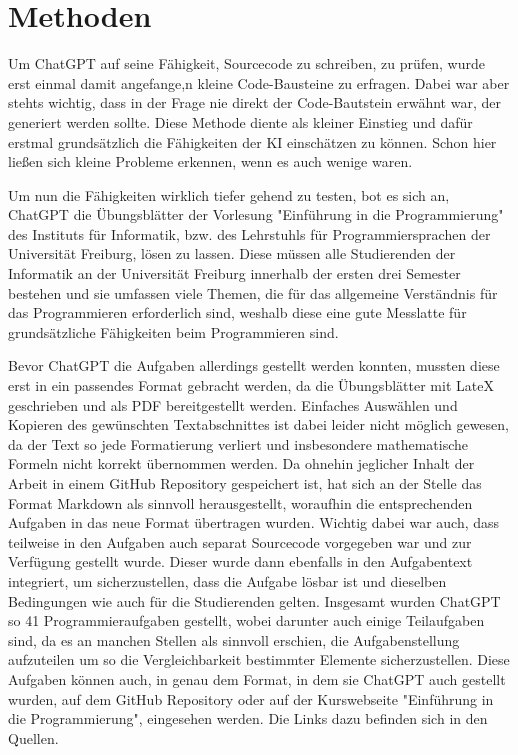 \documentclass[class=scrbook, crop=false]{standalone}
\begin{document}
\chapter{Methoden}
\label{ch:methoden}
    Um ChatGPT auf seine Fähigkeit, Sourcecode zu schreiben, zu prüfen, wurde erst einmal damit angefange,n kleine Code-Bausteine zu erfragen.
    Dabei war aber stehts wichtig, dass in der Frage nie direkt der Code-Bautstein erwähnt war, der generiert werden sollte.
    Diese Methode diente als kleiner Einstieg und dafür erstmal grundsätzlich die Fähigkeiten der KI einschätzen zu können.
    Schon hier ließen sich kleine Probleme erkennen, wenn es auch wenige waren.

    Um nun die Fähigkeiten wirklich tiefer gehend zu testen, bot es sich an, ChatGPT die Übungsblätter der Vorlesung "Einführung in die Programmierung"
    des Instituts für Informatik, bzw. des Lehrstuhls für Programmiersprachen der Universität Freiburg, lösen zu lassen.
    Diese müssen alle Studierenden der Informatik an der Universität Freiburg innerhalb der ersten drei Semester bestehen
    und sie umfassen viele Themen, die für das allgemeine Verständnis für das Programmieren erforderlich sind,
    weshalb diese eine gute Messlatte für grundsätzliche Fähigkeiten beim Programmieren sind.

    Bevor ChatGPT die Aufgaben allerdings gestellt werden konnten, mussten diese erst in ein passendes Format gebracht werden, da
    die Übungsblätter mit LateX geschrieben und als PDF bereitgestellt werden.
    Einfaches Auswählen und Kopieren des gewünschten Textabschnittes ist dabei leider nicht möglich gewesen, da der Text
    so jede Formatierung verliert und insbesondere mathematische Formeln nicht korrekt übernommen werden.
    Da ohnehin jeglicher Inhalt der Arbeit in einem GitHub Repository gespeichert ist,
    hat sich an der Stelle das Format Markdown als sinnvoll herausgestellt, woraufhin die entsprechenden Aufgaben in das neue Format übertragen wurden.
    Wichtig dabei war auch, dass teilweise in den Aufgaben auch separat Sourcecode vorgegeben war und zur Verfügung gestellt wurde.
    Dieser wurde dann ebenfalls in den Aufgabentext integriert, um sicherzustellen, dass die Aufgabe lösbar ist und dieselben Bedingungen wie auch für die Studierenden gelten.
    Insgesamt wurden ChatGPT so 41 Programmieraufgaben gestellt, wobei darunter auch einige Teilaufgaben sind, da es an manchen Stellen
    als sinnvoll erschien, die Aufgabenstellung aufzuteilen um so die Vergleichbarkeit bestimmter Elemente sicherzustellen.
    Diese Aufgaben können auch, in genau dem Format, in dem sie ChatGPT auch gestellt wurden, auf dem GitHub Repository oder
    auf der Kurswebseite "Einführung in die Programmierung", eingesehen werden.
    Die Links dazu befinden sich in den Quellen.
\end{document}
